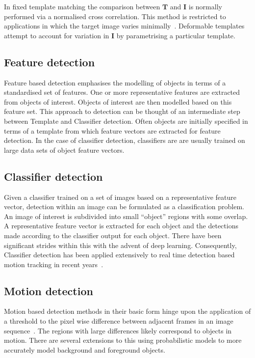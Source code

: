 In fixed template matching the comparison between $\mathbf{T}$ and $\mathbf{I}$ is normally
performed via a normalised cross correlation. This method is restricted to
applications in which the target image varies minimally~\cite{Shantaiya2013}.
Deformable templates attempt to account for variation in $\mathbf{I}$ by
parametrising a particular template.

\subsection{Feature detection}
Feature based detection emphasises the modelling of objects in terms of a
standardised set of features. One or more representative features are extracted
from objects of interest. Objects of interest are then modelled based on this
feature set.
This approach to detection can be thought of an intermediate step between
Template and Classifier detection. Often objects are initially specified in
terms of a template from which feature vectors are extracted for feature
detection. In the case of classifier detection, classifiers are are usually
trained on large data sets of object feature vectors.

\subsection{Classifier detection}
Given a classifier trained on a set of images based on a representative feature
vector, detection within an image can be formulated as a classification problem.
An image of interest is subdivided into small ``object'' regions with some
overlap. A representative feature vector is extracted for each object and the
detections made according to the classifier output for each object. There have
been significant strides within this with the advent of deep learning.
Consequently, Classifier detection has been applied extensively to real time detection
based motion tracking in recent years~\cite{goturn}.

\subsection{Motion detection}
Motion based detection methods in their basic form hinge upon the application of
a threshold to the pixel wise difference between adjacent frames in an image
sequence~\cite{Shantaiya2013}. The regions with large differences likely
correspond to objects in motion. There are several extensions to this using
probabilistic models to more accurately model background and foreground objects.

